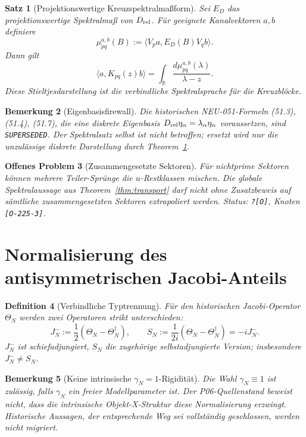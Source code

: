 \documentclass[11pt,a4paper]{amsart}
\newtheorem{theorem}{Satz}[section]
\newtheorem{definition}[theorem]{Definition}
\newtheorem{remark}[theorem]{Bemerkung}
\newtheorem{openproblem}[theorem]{Offenes Problem}
\newcommand{\Open}{\texttt{?[O]}}
\begin{document}
\begin{theorem}[Projektionswertige Kreuzspektralmaßform]\label{thm:cross-spectral-measure}
Sei $E_D$ das projektionswertige Spektralmaß von $D_{\rm rel}$. Für geeignete
Kanalvektoren $a,b$ definiere
\[
\mu_{pq}^{a,b}(B):=\langle V_pa,E_D(B)V_qb\rangle.
\]
Dann gilt
\[
\boxed{\langle a,K_{pq}(z)b\rangle
=\int_{\mathbb R}\frac{d\mu_{pq}^{a,b}(\lambda)}{\lambda-z}.}
\]
Diese Stieltjesdarstellung ist die verbindliche Spektralsprache für die
Kreuzblöcke.
\end{theorem}

\begin{remark}[Eigenbasisfirewall]
Die historischen NEU-051-Formeln (51.3), (51.4), (51.7), die eine diskrete
Eigenbasis $D_{\rm rel}\eta_\alpha=\lambda_\alpha\eta_\alpha$ voraussetzen,
sind \texttt{SUPERSEDED}. Der Spektralsatz selbst ist nicht betroffen; ersetzt
wird nur die unzulässige diskrete Darstellung durch
Theorem~\ref{thm:cross-spectral-measure}.
\end{remark}

\begin{openproblem}[Zusammengesetzte Sektoren]\label{op:composite-sectors}
Für nichtprime Sektoren können mehrere Teiler-Sprünge die $u$-Restklassen
mischen. Die globale Spektralaussage aus Theorem~\ref{thm:transport} darf nicht
ohne Zusatzbeweis auf sämtliche zusammengesetzten Sektoren extrapoliert
werden. Status: \Open, Knoten \texttt{[O-225-3]}.
\end{openproblem}

\section{Normalisierung des antisymmetrischen Jacobi-Anteils}

\begin{definition}[Verbindliche Typtrennung]\label{def:jminus-s}
Für den historischen Jacobi-Operator $\Theta_N$ werden zwei Operatoren strikt
unterschieden:
\[
\boxed{J_N^-:=\frac12(\Theta_N-\Theta_N^\dagger),}
\qquad
\boxed{S_N:=\frac1{2i}(\Theta_N-\Theta_N^\dagger)=-iJ_N^-.}
\]
$J_N^-$ ist schiefadjungiert, $S_N$ die zugehörige selbstadjungierte Version;
insbesondere $J_N^-\neq S_N$.
\end{definition}

\begin{remark}[Keine intrinsische $\gamma_N=1$-Rigidität]
Die Wahl $\gamma_N\equiv1$ ist zulässig, falls $\gamma_N$ ein freier
Modellparameter ist. Der P06-Quellenstand beweist nicht, dass die intrinsische
Objekt-X-Struktur diese Normalisierung erzwingt. Historische Aussagen, der
entsprechende Weg sei vollständig geschlossen, werden nicht migriert.
\end{remark}
\end{document}
